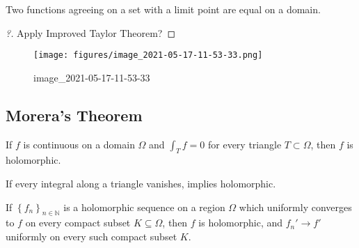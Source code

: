 \begin{slogan}

Two functions agreeing on a set with a limit point are equal on a
domain.

\end{slogan}

\begin{proof}[?]

Apply Improved Taylor Theorem? 

\end{proof}

\begin{exercise}[?]

\begin{figure}
\centering
\texttt{[image: figures/image\_2021-05-17-11-53-33.png]}
\caption{image\_2021-05-17-11-53-33}
\end{figure}

\end{exercise}

\hypertarget{moreras-theorem}{%
\subsection{Morera's Theorem}\label{moreras-theorem}}

\begin{theorem}\label{Morera}

If \(f\) is continuous on a domain \(\Omega\) and \(\int_T f = 0\) for
every triangle \(T\subset \Omega\), then \(f\) is holomorphic.

\end{theorem}

\begin{slogan}

If every integral along a triangle vanishes, implies holomorphic.

\end{slogan}

\begin{corollary}

If \(\left\{{ f_n }\right\}_{n\in {\mathbb{N}}}\) is a holomorphic
sequence on a region \(\Omega\) which uniformly converges to \(f\) on
every compact subset \(K \subseteq \Omega\), then \(f\) is holomorphic,
and \(f_n' \to f'\) uniformly on every such compact subset \(K\).

\end{corollary}

